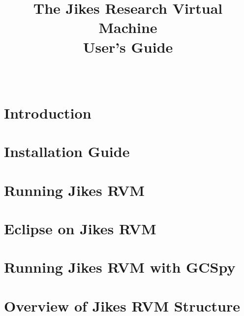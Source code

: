 \documentclass{article}
\title{\texonly{\vfill} {\huge The Jikes\TMboth{} 
Research Virtual Machine \\
User's Guide} 
\\ {\huge \version{} }\\ { } \texonly{\vfill} }
\newcommand{\jrvm}{Jikes RVM}
\begin{document}
\maketitle
\date{}

\T \newpage
   \T 
   \T \cleardoublepage

\label{hlxtoc}
\T \tableofcontents
\T \listoffigures
\T \listoftables
\W {}

\T \newpage
\section{Introduction}


\T \newpage
{}
\section{Installation Guide} \label{section:installation}


\T \newpage
\section{Running \jrvm} \label{section:running}


\T \newpage
\section{Eclipse on Jikes RVM} \label{section:eclipse}


\T \newpage
\section{Running Jikes RVM with GCSpy} \label{section:gcspy}


\T \newpage
{}
\section{Overview of \jrvm{} Structure}

\end{document}
